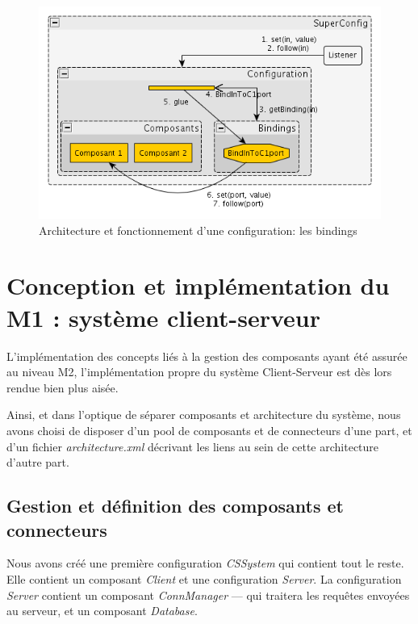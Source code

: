 \documentclass[french,a4paper,titlepage]{article}
\begin{document}
			\begin{figure}[ht]
				\centering
				\includegraphics[width=1.00\textwidth]{obsimpl2.png}
				\caption{Architecture et fonctionnement d'une configuration: les
          			  bindings}
				\label{fig:obsimpl2}
			\end{figure}
			
			
	\section{Conception et implémentation du M1 : système client-serveur}\label{s:m1}
	
	  L'implémentation des concepts liés à la gestion des composants ayant été
	  assurée au niveau M2, l'implémentation propre du système Client-Serveur est
	  dès lors rendue bien plus aisée.
	  
    Ainsi, et dans l'optique de séparer composants et architecture du système,
    nous avons choisi de disposer d'un pool de composants et de connecteurs
    d'une part, et d'un fichier \emph{architecture.xml} décrivant les liens au
    sein de cette architecture d'autre part.
    
    \subsection{Gestion et définition des composants et connecteurs}

    	Nous avons créé une première configuration \emph{CSSystem} qui contient tout le reste. Elle contient un composant \emph{Client} et une configuration \emph{Server}. La configuration \emph{Server} contient un composant \emph{ConnManager} --- qui traitera les requêtes envoyées au serveur, et un composant \emph{Database}.
    	
\end{document}
